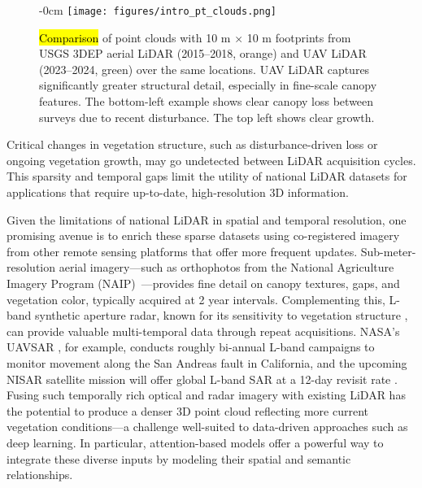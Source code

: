 \documentclass[remotesensing,article,accept,pdftex,moreauthors]{Definitions/mdpi}
\begin{document}
\vspace{-5pt}
\begin{figure}[H]
\begin{adjustwidth}{-\extralength}{0cm}
    \centering
    \texttt{[image: figures/intro\_pt\_clouds.png]}
\end{adjustwidth}
\caption{\hl{Comparison} %
 of point clouds with 10 m × 10 m footprints from USGS 3DEP aerial LiDAR (2015--2018, orange) and UAV LiDAR (2023--2024, green) over the same locations. UAV LiDAR captures significantly greater structural detail, especially in fine-scale canopy features. The bottom-left example shows clear canopy loss between surveys due to recent disturbance. The top left shows clear growth.}
    \label{fig:intro_pt_clouds}
\end{figure}


Critical changes in vegetation structure, such as disturbance-driven loss or ongoing vegetation growth, may go undetected between LiDAR acquisition cycles. This sparsity and temporal gaps limit the utility of national LiDAR datasets for applications that require up-to-date, high-resolution 3D information.

Given the limitations of national LiDAR in spatial and temporal resolution, one promising avenue is to enrich these sparse datasets using co-registered imagery from other remote sensing platforms that offer more frequent updates. Sub-meter-resolution aerial imagery—such as orthophotos from the National Agriculture Imagery Program (NAIP)~\cite{usda_naip_2024}—provides fine detail on canopy textures, gaps, and vegetation color, typically acquired at 2 year intervals. Complementing this, L-band synthetic aperture radar, known for its sensitivity to vegetation structure \cite{wang2025interpretable}, can provide valuable multi-temporal data through repeat acquisitions. NASA’s UAVSAR \cite{rosen2006uavsar}, for example, conducts roughly bi-annual L-band campaigns to monitor movement along the San Andreas fault in California, and the upcoming NISAR satellite mission will offer global L-band SAR at a 12-day revisit rate \cite{kellogg2020nasa}. Fusing such temporally rich optical and radar imagery with existing LiDAR has the potential to produce a denser 3D point cloud reflecting more current vegetation conditions—a challenge well-suited to data-driven approaches such as deep learning. In particular, attention-based models offer a powerful way to integrate these diverse inputs by modeling their spatial and semantic relationships.
\end{document}
